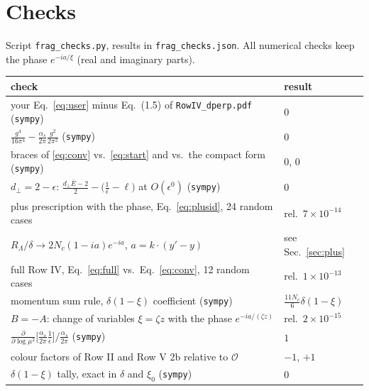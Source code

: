 \documentclass[10pt]{article}
\numberwithin{equation}{section}
\newcommand{\OO}{\mathcal O}
\begin{document}
\section{Checks}
Script \texttt{frag\_checks.py}, results in \texttt{frag\_checks.json}. All numerical checks keep the phase $e^{-ia/\xi}$ (real and imaginary parts).
\begin{center}\small
\begin{tabular}{@{}p{}p{}@{}}\toprule
check & result\\\midrule
your Eq.~\eqref{eq:user} minus Eq.~(1.5) of \texttt{RowIV\_dperp.pdf} (\texttt{sympy}) & $0$\\
$\frac{g^4}{16\pi^4}-\frac{\alpha_s}{2\pi}\frac{g^2}{2\pi^2}$ (\texttt{sympy}) & $0$\\
braces of \eqref{eq:conv} vs.\ \eqref{eq:start} and vs.\ the compact form (\texttt{sympy}) & $0$, $0$\\
$d_\perp=2-\epsilon$: $\frac{d_\perp\bar E-2}{2}-\big(\frac1{\bar\epsilon}-\ell\big)$ at $O(\epsilon^0)$ (\texttt{sympy}) & $0$\\
plus prescription with the phase, Eq.~\eqref{eq:plusid}, 24 random cases & rel.\ $7\times10^{-14}$\\
$R_\Lambda/\delta\to2N_c(1-ia)e^{-ia}$, $a=k\cdot(y'-y)$ & see Sec.~\ref{sec:plus}\\
full Row IV, Eq.~\eqref{eq:full} vs.\ Eq.~\eqref{eq:conv}, 12 random cases & rel.\ $1\times10^{-13}$\\
momentum sum rule, $\delta(1-\xi)$ coefficient (\texttt{sympy}) & $\frac{11N_c}{6}\delta(1-\xi)$\\
$B=-A$: change of variables $\xi=\zeta z$ with the phase $e^{-ia/(\zeta z)}$ & rel.\ $2\times10^{-15}$\\
$\frac{\partial}{\partial\log\mu^2}\big[\frac{\alpha_s}{2\pi}\frac{1}{\bar\epsilon}\big]\big/\frac{\alpha_s}{2\pi}$ (\texttt{sympy}) & $1$\\
colour factors of Row II and Row V 2b relative to $\OO$ & $-1$, $+1$\\
$\delta(1-\xi)$ tally, exact in $\delta$ and $\xi_0$ (\texttt{sympy}) & $0$\\\bottomrule
\end{tabular}
\end{center}
\end{document}
